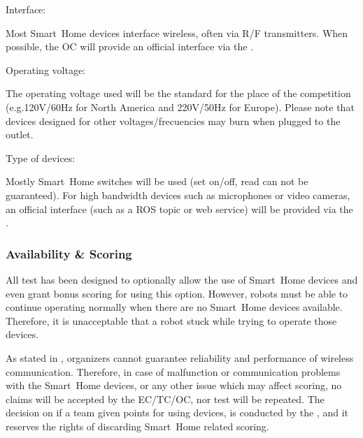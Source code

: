 \begin{enumerate}
	{\bf\item Interface:} Most Smart~Home devices interface wireless, often via R/F transmitters. When possible, the OC will provide an official interface via the .
	{\bf\item Operating voltage:} The operating voltage used will be the standard for the place of the competition (e.g.120V/60Hz for North America and 220V/50Hz for Europe). Please note that devices designed for other voltages/frecuencies may burn when plugged to the outlet.
	{\bf\item Type of devices:} Mostly Smart~Home switches will be used (set on/off, read can not be guaranteed). For high bandwidth devices such as microphones or video cameras, an official interface (such as a ROS topic or web service) will be provided via the .
\end{enumerate}

\subsubsection{Availability \& Scoring}
All test has been designed to optionally allow the use of Smart~Home devices and even grant bonus scoring for using this option. However, robots must be able to continue operating normally when there are no Smart~Home devices available. Therefore, it is unacceptable that a robot stuck while trying to operate those devices.

As stated in , organizers cannot guarantee reliability and performance of wireless communication. Therefore, in case of malfunction or communication problems with the Smart~Home devices, or any other issue which may affect scoring, no claims will be accepted by the EC/TC/OC, nor test will be repeated. The decision on if a team given points for using  devices, is conducted by the , and it reserves the rights of discarding Smart~Home related scoring.
